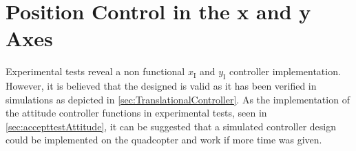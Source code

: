 \section{Position Control in the x and y Axes}
%
Experimental tests reveal a non functional $x_{\mathrm{I}}$ and $y_{\mathrm{I}}$ controller implementation. However, it is believed that the designed is valid as it has been verified in simulations as depicted in \autoref{sec:TranslationalController}. As the implementation of the attitude controller functions in experimental tests, seen in \autoref{sec:accepttestAttitude}, it can be suggested that a simulated controller design could be implemented on the quadcopter and work if more time was given.


%
